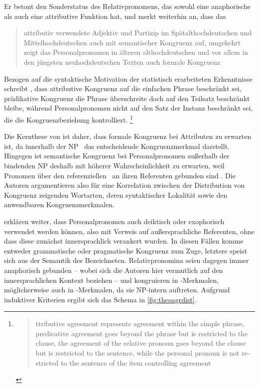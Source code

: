 Er betont den Sonderstatus des Relativpronomens, das sowohl eine anaphorische
als auch eine attributive Funktion hat, und merkt weiterhin an, dass das
\blockcquote[194]{fleischer2012}{attributiv verwendete Adjektiv und Partizip
\textelp{} im Spätalthochdeutschen und Mittelhochdeutschen auch mit
semantischer Kongruenz auf, umgekehrt zeigt das Personalpronomen
in älteren althochdeutschen und vor allem in den jüngsten neuhochdeutschen
Texten auch formale Kongruenz}.

Bezogen auf die syntaktische Motivation der statistisch erarbeiteten
Erkenntnisse schreibt \citet[216]{corbett1979}, dass attributive Kongruenz auf
die einfachen Phrase beschränkt sei, prädikative Kongruenz die Phrase
überschreite doch auf den Teilsatz beschränkt bleibe, während Personalpronomen
nicht auf den Satz der Instanz beschränkt sei, die die Kongruenzbeziehung
kontrolliert.%
%
	\footnote{\foreignblockcquote{english}[216]{corbett1979}{%
		ttributive agreement represents agreement within the simple
		phrase, predicative agreement goes beyond the phrase but is restricted
		to the clause, the agreement of the relative pronoun goes beyond the
		clause but is restricted to the sentence, while the personal pronoun is
		not restricted to the sentence of the item controlling agreement}.}

Die Kernthese von \citet{wechslerzlatic2003} ist daher, dass formale
Kongruenz bei Attributen zu erwarten ist, da innerhalb der NP \Concord\ das
entscheidende Kongruenzmerkmal darstellt.
Hingegen ist semantische Kongruenz bei Personalpronomen außerhalb der
bindenden NP deshalb mit höherer Wahrscheinlichkeit zu erwarten, weil Pronomen
über den referenziellen \Index\ an ihren Referenten gebunden sind
\citep[89--91]{wechslerzlatic2003}. Die Autoren argumentieren also für eine
Korrelation zwischen der Distribution von Kongruenz zeigenden Wortarten, deren
syntaktischer Lokalität sowie den anwendbaren Kongruenz\-merkmalen.

\cite[89]{wechslerzlatic2003} erklären weiter, dass Personalpronomen auch
deiktisch oder exophorisch verwendet werden können, also mit Verweis auf
außersprachliche Referenten, ohne dass diese zunächst innersprachlich verankert
wurden. In diesen Fällen komme entweder grammatische oder pragmatische
Kongruenz zum Zuge, letztere speist sich aus der Semantik des Bezeichneten.
Relativpronomina seien dagegen immer anaphorisch gebunden -- wobei sich die
Autoren hier vermutlich auf den innersprachlichen Kontext beziehen -- und
kongruieren in \Index-Merkmalen, möglicherweise auch in \Concord-Merkmalen, da
sie NP-intern auftreten. Aufgrund induktiver Kriterien ergibt sich das Schema
in \cref{fig:theoagrdist}.

